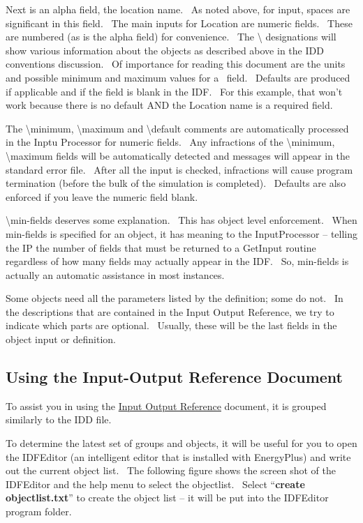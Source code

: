 Next is an alpha field, the location name.~ As noted above, for input, spaces are significant in this field.~ The main inputs for Location are numeric fields.~ These are numbered (as is the alpha field) for convenience.~ The \textbackslash{} designations will show various information about the objects as described above in the IDD conventions discussion.~ Of importance for reading this document are the units and possible minimum and maximum values for a~ field.~ Defaults are produced if applicable and if the field is blank in the IDF.~ For this example, that won't work because there is no default AND the Location name is a required field.

The \textbackslash{}minimum, \textbackslash{}maximum and \textbackslash{}default comments are automatically processed in the Inptu Processor for numeric fields.~ Any infractions of the \textbackslash{}minimum, \textbackslash{}maximum fields will be automatically detected and messages will appear in the standard error file.~ After all the input is checked, infractions will cause program termination (before the bulk of the simulation is completed).~ Defaults are also enforced if you leave the numeric field blank.

\textbackslash{}min-fields deserves some explanation.~ This has object level enforcement.~ When min-fields is specified for an object, it has meaning to the InputProcessor -- telling the IP the number of fields that must be returned to a GetInput routine regardless of how many fields may actually appear in the IDF.~ So, min-fields is actually an automatic assistance in most instances.

Some objects need all the parameters listed by the definition; some do not.~ In the descriptions that are contained in the Input Output Reference, we try to indicate which parts are optional.~ Usually, these will be the last fields in the object input or definition.

\subsection{Using the Input-Output Reference Document}\label{using-the-input-output-reference-document}

To assist you in using the \href{InputOutputReference.pdf}{Input Output Reference} document, it is grouped similarly to the IDD file.

To determine the latest set of groups and objects, it will be useful for you to open the IDFEditor (an intelligent editor that is installed with EnergyPlus) and write out the current object list.~ The following figure shows the screen shot of the IDFEditor and the help menu to select the objectlist.~ Select ``\textbf{create objectlist.txt}'' to create the object list -- it will be put into the IDFEditor program folder.

